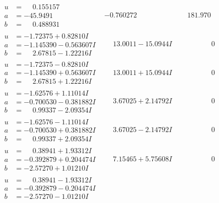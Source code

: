 \documentclass[1p]{elsarticle_modified}
\theoremstyle{definition}
\begin{document}
$$\begin{array}{c|c|c}
\begin{aligned}
u &= \phantom{-}0.155157\phantom{ +0.000000I} \\
a &= -45.9491\phantom{ +0.000000I} \\
b &= \phantom{-}0.488931\phantom{ +0.000000I}\end{aligned}
 & -0.760272\phantom{ +0.000000I} & \phantom{-}181.970\phantom{ +0.000000I} \\ \hline\begin{aligned}
u &= -1.72375 + 0.82810 I \\
a &= -1.145390 - 0.563607 I \\
b &= \phantom{-}2.67815 - 1.22216 I\end{aligned}
 & \phantom{-}13.0011 - 15.0944 I & \phantom{-0.000000 } 0 \\ \hline\begin{aligned}
u &= -1.72375 - 0.82810 I \\
a &= -1.145390 + 0.563607 I \\
b &= \phantom{-}2.67815 + 1.22216 I\end{aligned}
 & \phantom{-}13.0011 + 15.0944 I & \phantom{-0.000000 } 0 \\ \hline\begin{aligned}
u &= -1.62576 + 1.11014 I \\
a &= -0.700530 - 0.381882 I \\
b &= \phantom{-}0.99337 - 2.09354 I\end{aligned}
 & \phantom{-}3.67025 + 2.14792 I & \phantom{-0.000000 } 0 \\ \hline\begin{aligned}
u &= -1.62576 - 1.11014 I \\
a &= -0.700530 + 0.381882 I \\
b &= \phantom{-}0.99337 + 2.09354 I\end{aligned}
 & \phantom{-}3.67025 - 2.14792 I & \phantom{-0.000000 } 0 \\ \hline\begin{aligned}
u &= \phantom{-}0.38941 + 1.93312 I \\
a &= -0.392879 + 0.204474 I \\
b &= -2.57270 + 1.01210 I\end{aligned}
 & \phantom{-}7.15465 + 5.75608 I & \phantom{-0.000000 } 0 \\ \hline\begin{aligned}
u &= \phantom{-}0.38941 - 1.93312 I \\
a &= -0.392879 - 0.204474 I \\
b &= -2.57270 - 1.01210 I\end{aligned}

\end{array}$$
\end{document}
